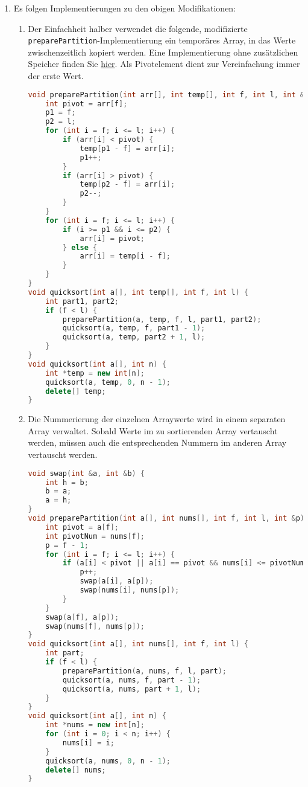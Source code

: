 \documentclass[11pt,a4paper]{article}
\begin{document}
\begin{loesung}
\begin{enumerate}
        \item Es folgen Implementierungen zu den obigen Modifikationen:
        \begin{enumerate}[label=\roman*)]
            \item Der Einfachheit halber verwendet die folgende, modifizierte \texttt{preparePartition}-Implementierung ein temporäres Array, in das Werte zwischenzeitlich kopiert werden.
            Eine Implementierung ohne zusätzlichen Speicher finden Sie \href{https://en.wikipedia.org/wiki/Dutch_national_flag_problem}{hier}. Als Pivotelement dient zur Vereinfachung immer der erste Wert.
            \begin{lstlisting}[language=c++]
void preparePartition(int arr[], int temp[], int f, int l, int &p1, int &p2) {
    int pivot = arr[f];
    p1 = f;
    p2 = l;
    for (int i = f; i <= l; i++) {
        if (arr[i] < pivot) {
            temp[p1 - f] = arr[i];
            p1++;
        }
        if (arr[i] > pivot) {
            temp[p2 - f] = arr[i];
            p2--;
        }
    }
    for (int i = f; i <= l; i++) {
        if (i >= p1 && i <= p2) {
            arr[i] = pivot;
        } else {
            arr[i] = temp[i - f];
        }
    }
} 
void quicksort(int a[], int temp[], int f, int l) {
    int part1, part2;
    if (f < l) {
        preparePartition(a, temp, f, l, part1, part2);
        quicksort(a, temp, f, part1 - 1);
        quicksort(a, temp, part2 + 1, l);
    }
}
void quicksort(int a[], int n) {
    int *temp = new int[n];
    quicksort(a, temp, 0, n - 1);
    delete[] temp;
}
            \end{lstlisting}

            \item 
            Die Nummerierung der einzelnen Arraywerte wird in einem separaten Array verwaltet.
            Sobald Werte im zu sortierenden Array vertauscht werden, müssen auch die entsprechenden Nummern im anderen Array vertauscht werden.
            \begin{lstlisting}[language=c++]
void swap(int &a, int &b) {
    int h = b;
    b = a;
    a = h;
}
void preparePartition(int a[], int nums[], int f, int l, int &p) {
    int pivot = a[f];
    int pivotNum = nums[f];
    p = f - 1;
    for (int i = f; i <= l; i++) {
        if (a[i] < pivot || a[i] == pivot && nums[i] <= pivotNum) {
            p++;
            swap(a[i], a[p]);
            swap(nums[i], nums[p]);
        }
    }
    swap(a[f], a[p]);
    swap(nums[f], nums[p]);
}
void quicksort(int a[], int nums[], int f, int l) {
    int part;
    if (f < l) {
        preparePartition(a, nums, f, l, part);
        quicksort(a, nums, f, part - 1);
        quicksort(a, nums, part + 1, l);
    }
}
void quicksort(int a[], int n) {
    int *nums = new int[n];
    for (int i = 0; i < n; i++) {
        nums[i] = i;
    }
    quicksort(a, nums, 0, n - 1);
    delete[] nums;
}
            \end{lstlisting}
        \end{enumerate}
    \end{enumerate}
\end{loesung}
\end{document}
